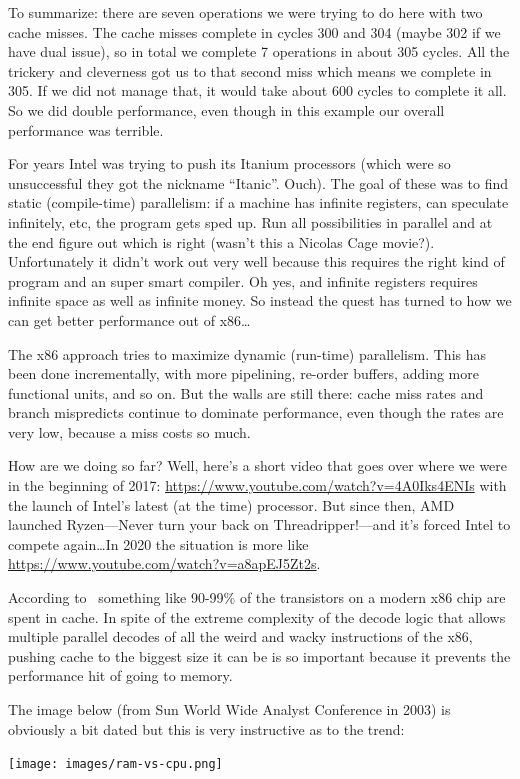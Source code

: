 \documentclass[a4paper]{report}
\begin{document}
To summarize: there are seven operations we were trying to do here with two cache misses. The cache misses complete in cycles 300 and 304 (maybe 302 if we have dual issue), so in total we complete 7 operations in about 305 cycles. All the trickery and cleverness got us to that second miss which means we complete in 305. If we did not manage that, it would take about 600 cycles to complete it all. So we did double performance, even though in this example our overall performance was terrible.
 
For years Intel was trying to push its Itanium processors (which were so unsuccessful they got the nickname ``Itanic''. Ouch). The goal of these was to find static (compile-time) parallelism: if a machine has infinite registers, can speculate infinitely, etc, the program gets sped up. Run all possibilities in parallel and at the end figure out which is right (wasn't this a Nicolas Cage movie?). Unfortunately it didn't work out very well because this requires the right kind of program and an super smart compiler. Oh yes, and infinite registers requires infinite space as well as infinite money. So instead the quest has turned to how we can get better performance out of x86\ldots

The x86 approach tries to maximize dynamic (run-time) parallelism. This has been done incrementally, with more pipelining, re-order buffers, adding more functional units, and so on. But the walls are still there: cache miss rates and branch mispredicts continue to dominate performance, even though the rates are very low, because a miss costs so much. 

How are we doing so far? Well, here's a short video that goes over where we were in the beginning of 2017: \url{https://www.youtube.com/watch?v=4A0Iks4ENIs} with the launch of Intel's latest (at the time) processor. But since then, AMD launched Ryzen---Never turn your back on Threadripper!---and it's forced Intel to compete again\ldots In 2020 the situation is more like \url{https://www.youtube.com/watch?v=a8apEJ5Zt2s}.

According to~\cite{modern-hardware} something like 90-99\% of the transistors on a modern x86 chip are spent in cache. In spite of the extreme complexity of the decode logic that allows multiple parallel decodes of all the weird and wacky instructions of the x86, pushing cache to the biggest size it can be is so important because it prevents the performance hit of going to memory.

The image below (from Sun World Wide Analyst Conference in 2003) is obviously a bit dated but this is very instructive as to the trend:
\begin{center}
\texttt{[image: images/ram-vs-cpu.png]}
\end{center}
\end{document}
